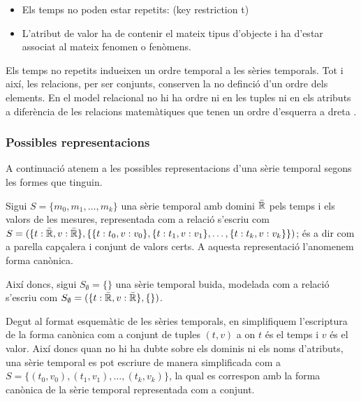 \begin{itemize}
\item Els temps no poden estar repetits: (key restriction {t})
\item L'atribut de valor ha de contenir el mateix tipus d'objecte i ha
  d'estar associat al mateix fenomen o fenòmens.
\end{itemize}

Els temps no repetits indueixen un ordre temporal a les sèries
temporals. Tot i així, les relacions, per ser conjunts, conserven la
no definció d'un ordre dels elements. En el model relacional no hi ha
ordre ni en les tuples ni en els atributs a diferència de les
relacions matemàtiques que tenen un ordre d'esquerra a
dreta \parencite[sec.\ 5.3]{date:introduction}.




\subsubsection{Possibles representacions}


A continuació atenem a les possibles representacions d'una sèrie
temporal segons les formes que tinguin.




\begin{definition}
  Sigui $S = \{ m_0, m_1 , \dotsc, m_k \}$ una sèrie temporal amb
  domini $\bar{\mathbb{R}{}}$ pels temps i els valors de les mesures,
  representada com a relació s'escriu com $S = ( \{t: \bar{\mathbb{R}{}}, v:
  \bar{\mathbb{R}{}}\}, \{ \{t:t_0,v:v_0\}, \{t:t_1,v:v_1\}, \dotsc,
  \{t:t_k,v:v_k\} \} )$; és a dir com a parella capçalera i conjunt de
  valors certs. A aquesta representació l'anomenem forma canònica.

  Així doncs, sigui $S_{\emptyset} = \{ \}$ una sèrie temporal buida,
  modelada com a relació s'escriu com $S_{\emptyset} = ( \{t:
  \bar{\mathbb{R}{}}, v: \bar{\mathbb{R}{}}\}, \{ \} )$.
\end{definition}


Degut al format esquemàtic de les sèries temporals, en simplifiquem
l'escriptura de la forma canònica com a conjunt de tuples $(t,v)$ a on
$t$ és el temps i $v$ és el valor. Així doncs quan no hi ha dubte
sobre els dominis ni els noms d'atributs, una sèrie temporal es pot
escriure de manera simplificada com a $S = \{ (t_0,v_0), (t_1,v_1),
\dotsc, (t_k,v_k) \}$, la qual es correspon amb la forma canònica de
la sèrie temporal representada com a conjunt.

